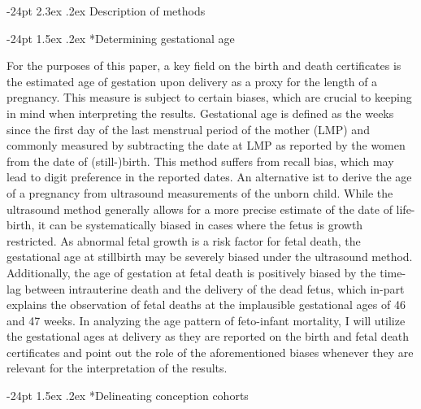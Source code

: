 \documentclass[10pt, twoside]{article}
\makeatletter
\renewcommand\section{\@startsection {section}{1}{\z@}%
                                   {-24pt}%
                                   {2.3ex \@plus.2ex}%
                                   {\normalfont\large\bfseries}}
\renewcommand\subsection{\@startsection{subsection}{2}{\z@}%
                                     {-24pt}%
                                     {1.5ex \@plus .2ex}%
                                     {\normalfont\normalsize\bfseries}}
\makeatother
\begin{document}
\clearpage

\hypertarget{appendix-appendix}{%
\appendix}


\hypertarget{description-of-methods}{%
\section{Description of methods}\label{description-of-methods}}

\hypertarget{determining-gestational-age}{%
\subsection*{Determining gestational age}\label{determining-gestational-age}}

For the purposes of this paper, a key field on the birth and death certificates is the estimated age of gestation upon delivery as a proxy for the length of a pregnancy. This measure is subject to certain biases, which are crucial to keeping in mind when interpreting the results.
Gestational age is defined as the weeks since the first day of the last menstrual period of the mother (LMP) and commonly measured by subtracting the date at LMP as reported by the women from the date of (still-)birth. This method suffers from recall bias, which may lead to digit preference in the reported dates. An alternative ist to derive the age of a pregnancy from ultrasound measurements of the unborn child. While the ultrasound method generally allows for a more precise estimate of the date of life-birth, it can be systematically biased in cases where the fetus is growth restricted. As abnormal fetal growth is a risk factor for fetal death, the gestational age at stillbirth may be severely biased under the ultrasound method. Additionally, the age of gestation at fetal death is positively biased by the time-lag between intrauterine death and the delivery of the dead fetus, which in-part explains the observation of fetal deaths at the implausible gestational ages of 46 and 47 weeks.
In analyzing the age pattern of feto-infant mortality, I will utilize the gestational ages at delivery as they are reported on the birth and fetal death certificates and point out the role of the aforementioned biases whenever they are relevant for the interpretation of the results.

\hypertarget{delineating-conception-cohorts}{%
\subsection*{Delineating conception cohorts}\label{delineating-conception-cohorts}}
\end{document}
